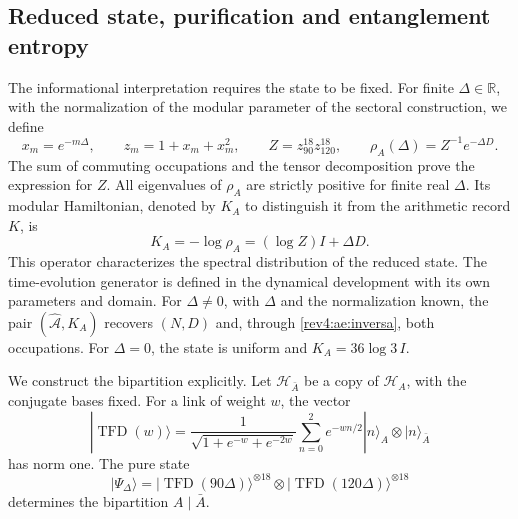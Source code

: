 \subsection{Reduced state, purification and entanglement entropy}

The informational interpretation requires the state to be fixed. For
finite \(\Delta\in\mathbb R\), with the normalization of the modular
parameter of the sectoral construction, we define
\begin{equation}
 x_m=e^{-m\Delta},\qquad z_m=1+x_m+x_m^2,
 \qquad Z=z_{90}^{18}z_{120}^{18},
 \qquad \rho_A(\Delta)=Z^{-1}e^{-\Delta D}.
 \label{rev4:ae:rho}
\end{equation}
The sum of commuting occupations and the tensor decomposition prove
the expression for \(Z\). All eigenvalues of \(\rho_A\) are
strictly positive for finite real \(\Delta\). Its modular
Hamiltonian, denoted by \(K_A\) to distinguish it from the arithmetic record
\(K\), is
\begin{equation}
 K_A=-\log\rho_A=(\log Z)I+\Delta D.
 \label{rev4:ae:modular}
\end{equation}
This operator characterizes the spectral distribution of the reduced state.
The time-evolution generator is defined in the dynamical development
with its own parameters and domain. For \(\Delta\ne0\), with
\(\Delta\) and the normalization known, the pair
\((\widehat{\mathcal A},K_A)\) recovers \((N,D)\) and, through
\eqref{rev4:ae:inversa}, both occupations. For \(\Delta=0\),
the state is uniform and \(K_A=36\log3\,I\).

We construct the bipartition explicitly. Let \(\mathscr H_{\bar A}\)
be a copy of \(\mathscr H_A\), with the conjugate bases fixed. For
a link of weight \(w\), the vector
\[
 |\operatorname{TFD}(w)\rangle
 =\frac1{\sqrt{1+e^{-w}+e^{-2w}}}
 \sum_{n=0}^{2}e^{-wn/2}|n\rangle_A\otimes|n\rangle_{\bar A}
\]
has norm one. The pure state
\begin{equation}
 |\Psi_\Delta\rangle
 =|\operatorname{TFD}(90\Delta)\rangle^{\otimes18}
  \otimes|\operatorname{TFD}(120\Delta)\rangle^{\otimes18}
 \label{rev4:ae:tfd}
\end{equation}
determines the bipartition \(A\mid\bar A\).

